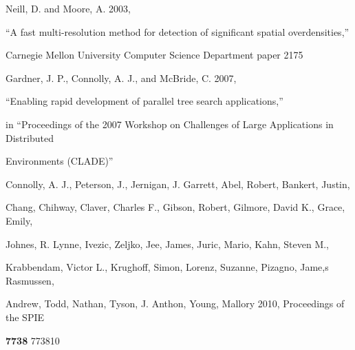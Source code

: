 \documentclass[prd,nofootbib,floatfix,11pt,tightenlines,nofootinbib]{revtex4}
\begin{document}
\begin{thebibliography}{99}

Neill, D. and Moore, A. 2003,

``A fast multi-resolution method for detection of significant spatial overdensities,''

Carnegie Mellon University Computer Science Department paper 2175






Gardner, J. P., Connolly, A. J., and McBride, C. 2007,

``Enabling rapid development of parallel tree search applications,''

in ``Proceedings of the 2007 Workshop on Challenges of Large Applications in Distributed

Environments (CLADE)''




Connolly, A. J., Peterson, J., Jernigan, J. Garrett, Abel, Robert, Bankert, Justin,

Chang, Chihway, Claver, Charles F., Gibson, Robert, Gilmore, David K., Grace, Emily,

Johnes, R. Lynne, Ivezic, Zeljko, Jee, James, Juric, Mario, Kahn, Steven M.,

Krabbendam, Victor L., Krughoff, Simon, Lorenz, Suzanne, Pizagno, Jame,s Rasmussen,

Andrew, Todd, Nathan, Tyson, J. Anthon, Young, Mallory 2010, Proceedings of the SPIE

{\bf 7738} 773810
















\end{thebibliography}
\end{document}
